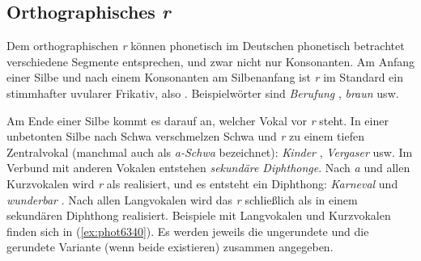 \subsection{Orthographisches \textit{r}}

\label{sec:orthographischesr}


Dem orthographischen \textit{r} können phonetisch im Deutschen phonetisch betrachtet verschiedene Segmente entsprechen, und zwar nicht nur Konsonanten.
Am Anfang einer Silbe und nach einem Konsonanten am Silbenanfang ist \textit{r} im Standard ein stimmhafter uvularer Frikativ, also \textipa{[K]}.
Beispielwörter sind \textit{Berufung} \textipa{[b@Ku:fUN]}, \textit{braun} \textipa{[bK\t{aO}n]} usw.

Am Ende einer Silbe kommt es darauf an, welcher Vokal vor \textit{r} steht.
In einer unbetonten Silbe nach Schwa verschmelzen Schwa und \textit{r} zu einem tiefen Zentralvokal \textipa{[5]} (manchmal auch als \textit{a-Schwa} bezeichnet): \textit{Kinder} \textipa{[kInd5]}, \textit{Vergaser} \textipa{[f5ga:z5]} usw.
Im Verbund mit anderen Vokalen entstehen \textit{sekundäre Diphthonge}.
Nach \textit{a} und allen Kurzvokalen wird \textit{r} als \textipa{[@]} realisiert, und es entsteht ein Diphthong: \textit{Karneval} \textipa{[k\t{a@}n@val]} und \textit{wunderbar} \textipa{[vUnd5b\t{a@}]}.
Nach allen Langvokalen wird das \textit{r} schließlich als \textipa{[5]} in einem sekundären Diphthong realisiert.
Beispiele mit Langvokalen und Kurzvokalen finden sich in (\ref{ex:phot6340}).
Es werden jeweils die ungerundete und die gerundete Variante (wenn beide existieren) zusammen angegeben.

\begin{exe}
  \ex\label{ex:phot6340}
  \begin{xlist}
  \end{xlist}
\end{exe}

